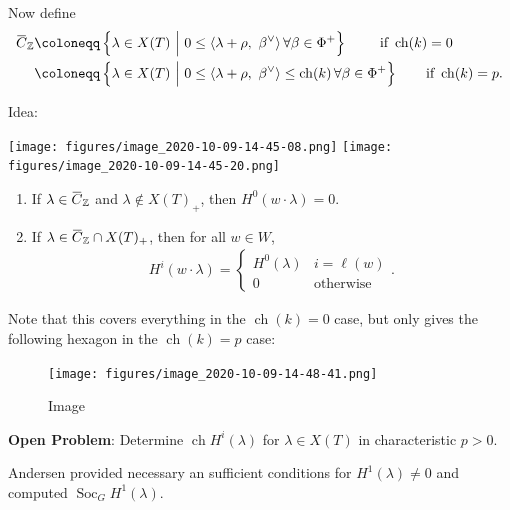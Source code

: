Now define
\begin{align*}  
\mkern 1.5mu\overline{\mkern-1.5muC\mkern-1.5mu}\mkern 1.5mu_{{\mathbb{Z}}} 
&\coloneqq
\left\{{
\lambda \in X(T) {~\mathrel{\Big|}~}0 \leq {\left\langle {\lambda+\rho},~{\beta^\vee} \right\rangle} \,\forall \beta \in \Phi^+
}\right\} \qquad\text{ if } \operatorname{ch}(k) = 0 \\
&\coloneqq
\left\{{
\lambda \in X(T) {~\mathrel{\Big|}~}0 \leq {\left\langle {\lambda+\rho},~{\beta^\vee} \right\rangle} \leq \operatorname{ch}(k) \,\forall \beta \in \Phi^+
}\right\} \qquad\text{if } \operatorname{ch}(k) = p
.\end{align*}

Idea:

\texttt{[image: figures/image\_2020-10-09-14-45-08.png]}
\texttt{[image: figures/image\_2020-10-09-14-45-20.png]}

\begin{theorem}

\begin{enumerate}
\def\labelenumi{\alph{enumi}.}
\item
  If
  \(\lambda \in \mkern 1.5mu\overline{\mkern-1.5muC\mkern-1.5mu}\mkern 1.5mu_{\mathbb{Z}}\)
  and \(\lambda \not\in X(T)_+\), then \(H^0(w\cdot \lambda) = 0\).
\item
  If
  \(\lambda \in \mkern 1.5mu\overline{\mkern-1.5muC\mkern-1.5mu}\mkern 1.5mu_{\mathbb{Z}}\cap X(T)_+\),
  then for all \(w\in W\),
  \begin{align*}  
  H^i(w\cdot \lambda) = 
  \begin{cases}
  H^0(\lambda) & i= \ell(w) \\
  0 & \text{otherwise}
  \end{cases}
  .\end{align*}
\end{enumerate}

\end{theorem}

Note that this covers everything in the \(\operatorname{ch}(k) = 0\)
case, but only gives the following hexagon in the
\(\operatorname{ch}(k) = p\) case:

\begin{figure}
\centering
\texttt{[image: figures/image\_2020-10-09-14-48-41.png]}
\caption{Image}
\end{figure}

\begin{remark}

\textbf{Open Problem}: Determine \(\operatorname{ch}H^i(\lambda)\) for
\(\lambda\in X(T)\) in characteristic \(p>0\).

Andersen provided necessary an sufficient conditions for
\(H^1(\lambda) \neq 0\) and computed
\(\operatorname{Soc}_G H^1(\lambda)\).

\end{remark}

